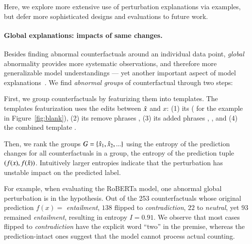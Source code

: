 Here, we explore more extensive use of perturbation explanations via examples, but defer more sophisticated designs and evaluations to future work.

\paragraph{Global explanations: impacts of same changes.}
Besides finding abnormal counterfactuals around an individual data point, \emph{global} abnormality provides more systematic observations, and therefore more generalizable model understandings --- yet another important aspect of model explanations~\cite{miller}.
We find \emph{abnormal groups} of counterfactual through two steps: 

First, we group counterfactuals by featurizing them into templates. 
The templates featurization uses the edits between $\hat{x}$ and $x$: 
(1) its \tagstr ( for the example in Figure~\ref{fig:blank}), 
(2) its remove phrases , 
(3) its added phrases , , and 
(4) the combined template .

Then, we rank the groups $G = \{ \hat{x}_1, \hat{x}_2, ...\}$ using the entropy of the prediction changes for all counterfactuals in a group, \ie the entropy of the prediction tuple $(f(x), f(\hat{x}))$.
Intuitively larger entropies indicate that the perturbation has unstable impact on the predicted label.

For example, when evaluating the \nli RoBERTa model, one abnormal global perturbation is  in the hypothesis.
Out of the 253 counterfactuals whose original prediction $f(x)=$ \emph{entailment}, $138$ flipped to \emph{contradiction}, $22$ to \emph{neutral}, yet $93$ remained \emph{entailment}, resulting in entropy $I=0.91$.
We observe that most cases flipped to \emph{contradiction} have the explicit word ``two'' in the premise, whereas the prediction-intact ones suggest that the model cannot process actual counting.


